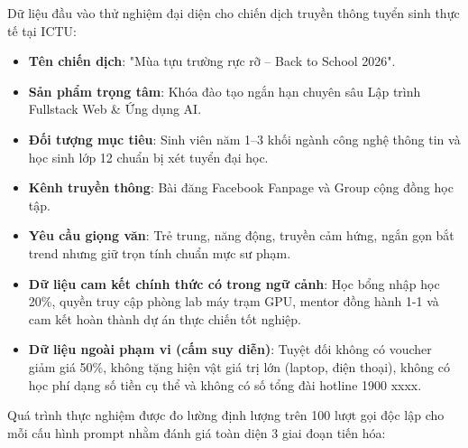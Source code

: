 Dữ liệu đầu vào thử nghiệm đại diện cho chiến dịch truyền thông tuyển sinh thực tế tại ICTU:
\begin{itemize}
\item \textbf{Tên chiến dịch}: "Mùa tựu trường rực rỡ -- Back to School 2026".
\item \textbf{Sản phẩm trọng tâm}: Khóa đào tạo ngắn hạn chuyên sâu Lập trình Fullstack Web \& Ứng dụng AI.
\item \textbf{Đối tượng mục tiêu}: Sinh viên năm 1--3 khối ngành công nghệ thông tin và học sinh lớp 12 chuẩn bị xét tuyển đại học.
\item \textbf{Kênh truyền thông}: Bài đăng Facebook Fanpage và Group cộng đồng học tập.
\item \textbf{Yêu cầu giọng văn}: Trẻ trung, năng động, truyền cảm hứng, ngắn gọn bắt trend nhưng giữ trọn tính chuẩn mực sư phạm.
\item \textbf{Dữ liệu cam kết chính thức có trong ngữ cảnh}: Học bổng nhập học 20\%, quyền truy cập phòng lab máy trạm GPU, mentor đồng hành 1-1 và cam kết hoàn thành dự án thực chiến tốt nghiệp.
\item \textbf{Dữ liệu ngoài phạm vi (cấm suy diễn)}: Tuyệt đối không có voucher giảm giá 50\%, không tặng hiện vật giá trị lớn (laptop, điện thoại), không có học phí dạng số tiền cụ thể và không có số tổng đài hotline 1900 xxxx.
\end{itemize}

Quá trình thực nghiệm được đo lường định lượng trên 100 lượt gọi độc lập cho mỗi cấu hình prompt nhằm đánh giá toàn diện 3 giai đoạn tiến hóa:

